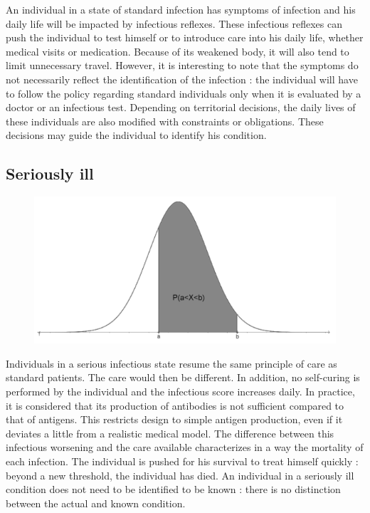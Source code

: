An individual in a state of standard infection has symptoms of infection and his daily life will be impacted by infectious reflexes. These infectious reflexes can push the individual to test himself or to introduce care into his daily life, whether medical visits or medication. Because of its weakened body, it will also tend to limit unnecessary travel. However, it is interesting to note that the symptoms do not necessarily reflect the identification of the infection : the individual will have to follow the policy regarding standard individuals only when it is evaluated by a doctor or an infectious test. Depending on territorial decisions, the daily lives of these individuals are also modified with constraints or obligations. These decisions may guide the individual to identify his condition.\\

\subsection{Seriously ill}

\begin{figure}
  \centering
  \includegraphics[trim = 384 0 0 0, clip, width=\linewidth]{Media/LoiGauss.png}
\end{figure}

Individuals in a serious infectious state resume the same principle of care as standard patients. The care would then be different. In addition, no self-curing is performed by the individual and the infectious score increases daily. In practice, it is considered that its production of antibodies is not sufficient compared to that of antigens. This restricts design to simple antigen production, even if it deviates a little from a realistic medical model. The difference between this infectious worsening and the care available characterizes in a way the mortality of each infection. The individual is pushed for his survival to treat himself quickly : beyond a new threshold, the individual has died. An individual in a seriously ill condition does not need to be identified to be known : there is no distinction between the actual and known condition.\\

